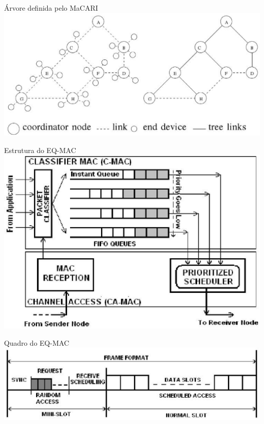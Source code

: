 \documentclass{beamer}
\begin{document}
\begin{frame}{Árvore definida pelo MaCARI \cite{20092812183087} \hyperlink{macari_tree_back}{}}
\hypertarget{macari_tree}{}
\includegraphics[scale=0.3]{imagens/macari_tree}
\end{frame}

\begin{frame}{Estrutura do EQ-MAC \cite{20092612148942} \hyperlink{eq-mac_back}{}}
\hypertarget{eq-mac}{}
\includegraphics[scale=0.3]{imagens/eq-mac}
\end{frame}

\begin{frame}{Quadro do EQ-MAC \cite{20092612148942} \hyperlink{quadro_eq-mac_back}{}}
\hypertarget{quadro_eq-mac}{}
\includegraphics[scale=0.4]{imagens/quadro_eq-mac}
\end{frame}



\end{document}
